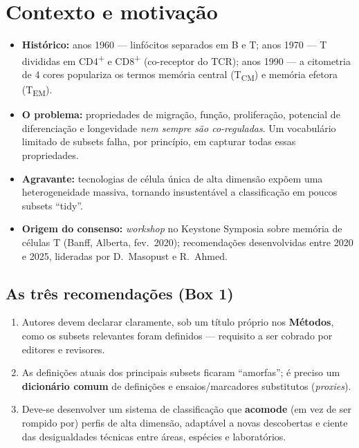 \documentclass[11pt,a4paper]{article}
\newcommand{\up}[1]{\textsuperscript{#1}}          %
\newcommand{\tc}[1]{T\textsubscript{#1}}           %
\begin{document}
\section{Contexto e motivação}
\begin{itemize}[leftmargin=1.4em,itemsep=2pt]
  \item \textbf{Histórico:} anos 1960 --- linfócitos separados em B e T; anos 1970 ---
        T divididas em CD4\up{+} e CD8\up{+} (co-receptor do TCR); anos 1990 --- a citometria
        de 4 cores populariza os termos memória central (\tc{CM}) e memória efetora (\tc{EM}).
  \item \textbf{O problema:} propriedades de migração, função, proliferação, potencial de
        diferenciação e longevidade \emph{nem sempre são co-reguladas}. Um vocabulário
        limitado de subsets falha, por princípio, em capturar todas essas propriedades.
  \item \textbf{Agravante:} tecnologias de célula única de alta dimensão expõem uma
        heterogeneidade massiva, tornando insustentável a classificação em poucos subsets
        ``tidy''.
  \item \textbf{Origem do consenso:} \emph{workshop} no Keystone Symposia sobre memória de
        células T (Banff, Alberta, fev.\ 2020); recomendações desenvolvidas entre 2020 e 2025,
        lideradas por D.~Masopust e R.~Ahmed.
\end{itemize}

\subsection{As três recomendações (Box 1)}
\begin{enumerate}[leftmargin=1.6em,itemsep=2pt]
  \item Autores devem declarar claramente, sob um título próprio nos \textbf{Métodos}, como
        os subsets relevantes foram definidos --- requisito a ser cobrado por editores e
        revisores.
  \item As definições atuais dos principais subsets ficaram ``amorfas''; é preciso um
        \textbf{dicionário comum} de definições e ensaios/marcadores substitutos (\emph{proxies}).
  \item Deve-se desenvolver um sistema de classificação que \textbf{acomode} (em vez de ser
        rompido por) perfis de alta dimensão, adaptável a novas descobertas e ciente das
        desigualdades técnicas entre áreas, espécies e laboratórios.
\end{enumerate}
\end{document}
